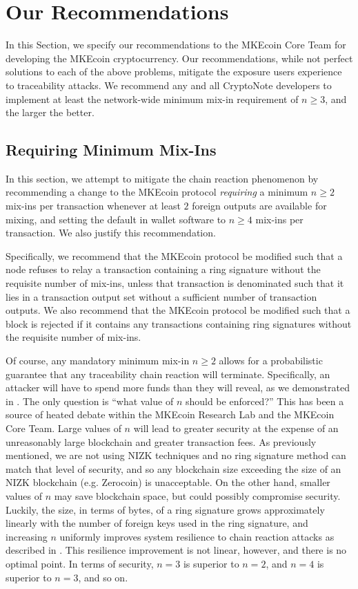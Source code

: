 \documentclass[12pt,english]{mrl}
\theoremstyle{definition}
\renewcommand{\geq}{\geqslant}
\numberwithin{equation}{section}
\numberwithin{figure}{section}
\numberwithin{equation}{section}
\numberwithin{equation}{section}
\numberwithin{figure}{section}
\begin{document}
\section{Our Recommendations}\label{Recommendations}

In this Section, we specify our recommendations to the MKEcoin Core Team for developing the MKEcoin cryptocurrency. Our recommendations, while not perfect solutions to each of the above problems, mitigate the exposure users experience to traceability attacks. We recommend any and all CryptoNote developers to implement at least the network-wide minimum mix-in requirement of $n\geq 3$, and the larger the better.

\subsection{Requiring Minimum Mix-Ins}\label{minMixIn}

In this section, we attempt to mitigate the chain reaction phenomenon by recommending a change to the MKEcoin protocol \textit{requiring} a minimum $n\geq 2$ mix-ins per transaction whenever at least $2$ foreign outputs are available for mixing, and setting the default in wallet software to $n\geq 4$ mix-ins per transaction. We also justify this recommendation. 

Specifically, we recommend that the MKEcoin protocol be modified such that a node refuses to relay a transaction containing a ring signature without the requisite number of mix-ins, unless that transaction is denominated such that it lies in a transaction output set without a sufficient number of transaction outputs. We also recommend that the MKEcoin protocol be modified such that a block is rejected if it contains any transactions containing ring signatures without the requisite number of mix-ins.

Of course, any mandatory minimum mix-in $n \geq 2$ allows for a probabilistic guarantee that any traceability chain reaction will terminate. Specifically, an attacker will have to spend more funds than they will reveal, as we demonstrated in \cite{chainReactions}. The only question is ``what value of $n$ should be enforced?'' This has been a source of heated debate within the MKEcoin Research Lab and the MKEcoin Core Team. Large values of $n$ will lead to greater security at the expense of an unreasonably large blockchain and greater transaction fees. As previously mentioned, we are not using NIZK techniques and no ring signature method can match that level of security, and so any blockchain size exceeding the size of an NIZK blockchain (e.g. Zerocoin) is unacceptable. On the other hand, smaller values of $n$ may save blockchain space, but could possibly compromise security. Luckily, the size, in terms of bytes, of a ring signature grows approximately linearly with the number of foreign keys used in the ring signature, and increasing $n$ uniformly improves system resilience to chain reaction attacks as described in \cite{chainReactions}. This resilience improvement is not linear, however, and there is no optimal point. In terms of security, $n=3$ is superior to $n=2$, and $n=4$ is superior to $n=3$, and so on.
\end{document}
